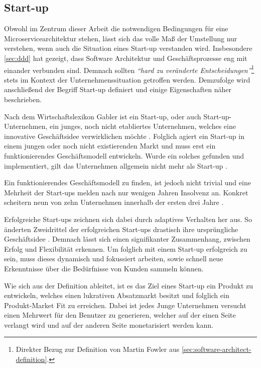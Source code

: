 \subsection{Start-up}

Obwohl im Zentrum dieser Arbeit die notwendigen Bedingungen für eine Microservicearchitektur stehen, lässt sich das volle Maß der Umstellung nur verstehen, wenn auch die Situation eines Start-up verstanden wird. Insbesondere \cref{sec:ddd} hat gezeigt, dass Software Architektur und Geschäftsprozesse eng mit einander verbunden sind. Demnach sollten \textit{\enquote{hard zu veränderte Entscheidungen}}\footnote{Direkter Bezug zur Definition von Martin Fowler aus \cref{sec:software-architect-definition}.} stets im Kontext der Unternehmenssituation getroffen werden. Demzufolge wird anschließend der Begriff Start-up definiert und einige Eigenschaften näher beschrieben.

Nach dem Wirtschaftslexikon Gabler ist ein Start-up, oder auch Start-up-Unternehmen, ein junges, noch nicht etabliertes Unternehmen, welches eine innovative Geschäftsidee verwirklichen möchte \parencite[vgl.][]{achleitner_start-up_2018}. Folglich agiert ein Start-up in einem jungen oder noch nicht existierenden Markt und muss erst ein funktionierendes Geschäftsmodell entwickeln. Wurde ein solches gefunden und implementiert, gilt das Unternehmen allgemein nicht mehr als Start-up \parencite[vgl.][]{wiki_start-up-unternehmen_2020}.

Ein funktionierendes Geschäftsmodell zu finden, ist jedoch nicht trivial und eine Mehrheit der Start-ups melden nach nur wenigen Jahren Insolvenz an. Konkret scheitern neun von zehn Unternehmen innerhalb der ersten drei Jahre \parencite[vgl.][]{patel_startups-fail_2015}.

Erfolgreiche Start-ups zeichnen sich dabei durch adaptives Verhalten her aus. So änderten Zweidrittel der erfolgreichen Start-ups drastisch ihre ursprüngliche Geschäftsidee \parencite{mullins_getting_2009}. Demnach lässt sich einen signifikanter Zusammenhang, zwischen Erfolg und Flexibilität erkennen. Um folglich mit einem Start-up erfolgreich zu sein, muss dieses dynamisch und fokussiert arbeiten, sowie schnell neue Erkenntnisse über die Bedürfnisse von Kunden sammeln können.

Wie sich aus der Definition ableitet, ist es das Ziel eines Start-up ein Produkt zu entwickeln, welches einen lukrativen Absatzmarkt besitzt und folglich ein Produkt-Market Fit zu erreichen. Dabei ist jedes Junge Unternehmen versucht einen Mehrwert für den Benutzer zu generieren, welcher auf der einen Seite verlangt wird und auf der anderen Seite monetarisiert werden kann.

